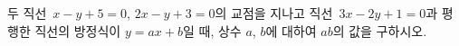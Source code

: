 두 직선~$x-y+5=0$, $2x-y+3=0$의 교점을 지나고 직선~$3x-2y+1=0$과 평행한 직선의 방정식이 $y=ax+b$일 때, 상수 $a$, $b$에 대하여 $ab$의 값을 구하시오.
